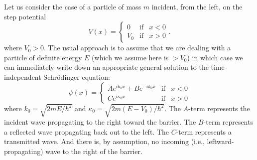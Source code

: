 \documentclass[aps,prc,twocolumn,letterpaper,floatfix]{revtex4}
\begin{document}
Let us consider the case of a particle of mass $m$ incident, from the
left, on the step potential
\begin{equation}
V(x) = \left\{ 
\begin{array}{lcc}
0 & \text{if} & x<0 \\
V_0 & \text{if} & x>0
\end{array}
\right. .
\end{equation}
where $V_0 > 0$.
The usual approach is to assume that we are dealing with a particle of
definite energy $E$ (which we assume here is $> V_0$) in which case we
can immediately write down an appropriate general solution to the
time-independent Schr\"odinger equation:
\begin{equation}
\psi(x) = \left\{
\begin{array}{lcc}
A e^{i k_0 x} + B e^{-i k_0 x} & \text{if} & x<0 \\
C e^{i \kappa_0 x} & \text{if} & x>0
\end{array}
\right.
\label{step-psi}
\end{equation}
where $k_0 = \sqrt{2mE/\hbar^2}$ and $\kappa_0 =
\sqrt{2m(E-V_0)/\hbar^2}$.  The $A$-term represents the incident wave
propagating to the right toward the barrier.  The $B$-term represents a
reflected wave propagating back out to the left.  The $C$-term
represents a transmitted wave.  And there is, by assumption, no
incoming (i.e., leftward-propagating) wave to the right of the
barrier.  
\end{document}
